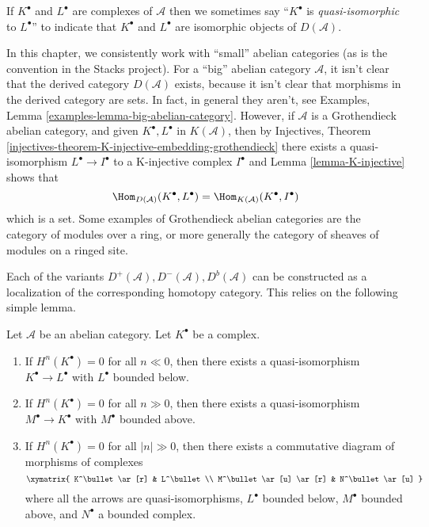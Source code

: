 \noindent
If $K^\bullet$ and $L^\bullet$ are complexes of $\mathcal{A}$
then we sometimes say ``$K^\bullet$ is {\it quasi-isomorphic} to
$L^\bullet$'' to indicate that $K^\bullet$ and $L^\bullet$ are
isomorphic objects of $D(\mathcal{A})$.

\begin{remark}
\label{remark-existence-derived}
In this chapter, we consistently work with ``small'' abelian categories
(as is the convention in the Stacks project). For a ``big'' abelian
category $\mathcal{A}$, it isn't clear that the derived category
$D(\mathcal{A})$ exists, because it isn't clear that morphisms in the
derived category are sets. In fact, in general they aren't, see
Examples, Lemma \ref{examples-lemma-big-abelian-category}.
However, if $\mathcal{A}$ is a Grothendieck abelian category, and given
$K^\bullet, L^\bullet$ in $K(\mathcal{A})$, then by
Injectives, Theorem \ref{injectives-theorem-K-injective-embedding-grothendieck}
there exists a quasi-isomorphism $L^\bullet \to I^\bullet$ to a
K-injective complex $I^\bullet$ and Lemma \ref{lemma-K-injective} shows that
$$
\Hom_{D(\mathcal{A})}(K^\bullet, L^\bullet) =
\Hom_{K(\mathcal{A})}(K^\bullet, I^\bullet)
$$
which is a set. Some examples of Grothendieck abelian categories
are the category of modules over a ring, or more generally
the category of sheaves of modules on a ringed site.
\end{remark}

\noindent
Each of the variants $D^{+}(\mathcal{A}), D^{-}(\mathcal{A}), D^b(\mathcal{A})$
can be constructed as a localization of the corresponding homotopy category.
This relies on the following simple lemma.

\begin{lemma}
\label{lemma-complex-cohomology-bounded}
Let $\mathcal{A}$ be an abelian category.
Let $K^\bullet$ be a complex.
\begin{enumerate}
\item If $H^n(K^\bullet) = 0$ for all $n \ll 0$, then there exists
a quasi-isomorphism $K^\bullet \to L^\bullet$ with $L^\bullet$
bounded below.
\item If $H^n(K^\bullet) = 0$ for all $n \gg 0$, then there exists
a quasi-isomorphism $M^\bullet \to K^\bullet$ with $M^\bullet$
bounded above.
\item If $H^n(K^\bullet) = 0$ for all $|n| \gg 0$, then there exists
a commutative diagram of morphisms of complexes
$$
\xymatrix{
K^\bullet \ar[r] & L^\bullet \\
M^\bullet \ar[u] \ar[r] & N^\bullet \ar[u]
}
$$
where all the arrows are quasi-isomorphisms, $L^\bullet$
bounded below, $M^\bullet$ bounded above, and $N^\bullet$ a bounded
complex.
\end{enumerate}
\end{lemma}

